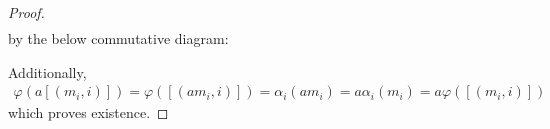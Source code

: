 \documentclass{article}
\newcommand{\fI}{\mathscr{I}}
\begin{document}
\begin{proof}
\begin{align*}
    \end{align*}
    by the below commutative diagram:
    \begin{center}
    \end{center}
    Additionally,
    \begin{align*}
        \varphi(a[(m_i,i)])=\varphi([(am_i,i)])=\alpha_i(am_i)=a\alpha_i(m_i)=a\varphi([(m_i,i)])
    \end{align*}
    which proves existence.
\end{proof}
\end{document}
